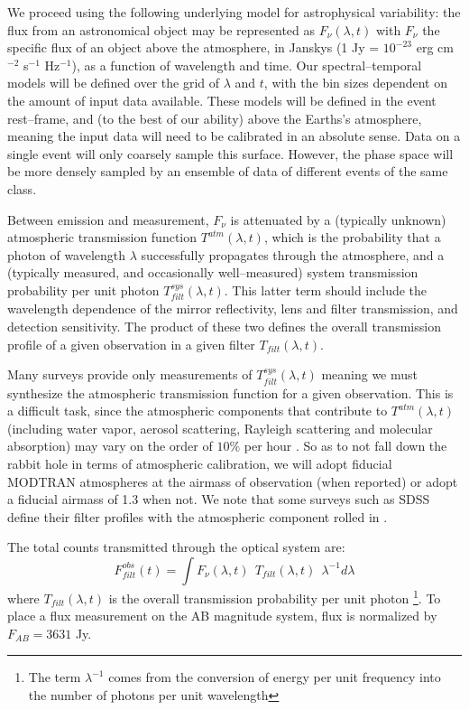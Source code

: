 \smallskip

We proceed using the following underlying model for astrophysical variability:
the flux from an astronomical object may be represented as $F_\nu(\lambda, t)$
with $F_\nu$ the specific flux of an object above the atmosphere, in Janskys (1
Jy = $10^{-23}$ erg cm$^{-2}$ s$^{-1}$ Hz$^{-1}$), as a function of wavelength
and time.  Our spectral--temporal models will be defined over the grid of
$\lambda$ and $t$, with the bin sizes dependent on the amount of input data
available.  These models will be defined in the event rest--frame, and (to the
best of our ability) above the Earths's atmosphere, meaning the input data will
need to be calibrated in an absolute sense. Data on a single event will only
coarsely sample this surface.  However, the phase space will be more densely
sampled by an ensemble of data of different events of the same class.

Between emission and measurement, $F_\nu$ is attenuated by a (typically unknown)
atmospheric transmission function $T^{atm}(\lambda, t)$, which is the
probability that a photon of wavelength $\lambda$ successfully propagates
through the atmosphere, and a (typically measured, and occasionally
well--measured) system transmission probability per unit photon
$T^{sys}_{filt}(\lambda, t)$.  This latter term should include the wavelength
dependence of the mirror reflectivity, lens and filter transmission, and
detection sensitivity.  The product of these two defines the overall
transmission profile of a given observation in a given filter $T_{filt}(\lambda,
t)$.

Many surveys provide only measurements of $T^{sys}_{filt}(\lambda, t)$
\citep[e.g.][]{2006ApJ...646.1436S} meaning we must synthesize the atmospheric
transmission function for a given observation.  This is a difficult task, since
the atmospheric components that contribute to $T^{atm}(\lambda, t)$ (including
water vapor, aerosol scattering, Rayleigh scattering and molecular absorption)
may vary on the order of $10\%$ per hour \citep{2007PASP..119.1163S}.  So as to
not fall down the rabbit hole in terms of atmospheric calibration, we will adopt
fiducial MODTRAN atmospheres \citep{1999SPIE.3756..348B} at the airmass of
observation (when reported) or adopt a fiducial airmass of 1.3 when not.  We
note that some surveys such as SDSS define their filter profiles with the
atmospheric component rolled in \citep{2007AJ....134..973I}.

The total counts transmitted through the optical system are: $$F^{obs}_{filt}
(t) = \int F_\nu(\lambda, t) ~~ T_{filt} (\lambda, t) ~~ \lambda^{-1} d\lambda$$
where $T_{filt}(\lambda, t)$ is the overall transmission probability per unit
photon \footnote{The term $\lambda^{-1}$ comes from the conversion of energy per
unit frequency into the number of photons per unit wavelength}. To place a flux
measurement on the AB magnitude system, flux is normalized by $F_{AB} = 3631$
Jy.

